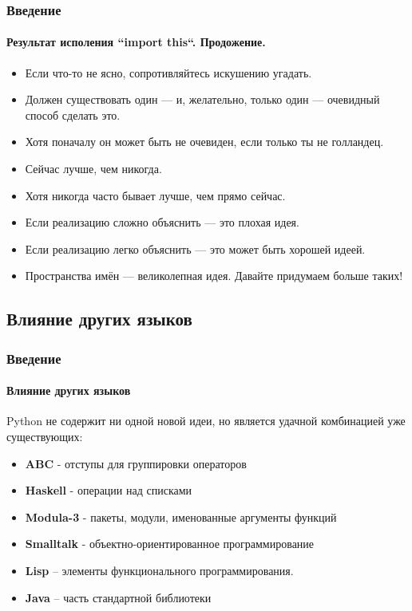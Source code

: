 \documentclass{beamer}
\begin{document}
\begin{frame}
\frametitle{Введение}
\framesubtitle{Результат исполения ``import this``. Продожение.}
\begin{itemize}
     \item<1-> Если что-то не ясно, сопротивляйтесь искушению угадать.
	 \item<1-> Должен существовать один — и, желательно, только один — очевидный способ сделать это.
	 \item<1-> Хотя поначалу он может быть не очевиден, если только ты не голландец.
	 \item<1-> Сейчас лучше, чем никогда.
	 \item<1-> Хотя никогда часто бывает лучше, чем прямо сейчас.
	 \item<1-> Если реализацию сложно объяснить — это плохая идея.
	 \item<1-> Если реализацию легко объяснить — это может быть хорошей идеей.
	 \item<1-> Пространства имён — великолепная идея. Давайте придумаем больше таких! 
\end{itemize}
\end{frame}

\subsection{Влияние других языков}
\begin{frame}
\frametitle{Введение}
\framesubtitle{Влияние других языков}
Python не содержит ни одной новой идеи, но является удачной комбинацией уже существующих:
\begin{itemize}
  \item<1> \textbf{ABC} - отступы для группировки операторов 
  \item<1> \textbf{Haskell} - операции над списками
  \item<1> \textbf{Modula-3} - пакеты, модули, именованные аргументы функций
  \item<1> \textbf{Smalltalk} - объектно-ориентированное программирование 
  \item<1> \textbf{Lisp} – элементы функционального программирования.
  \item<1> \textbf{Java} – часть стандартной библиотеки
\end{itemize}
\end{frame}
\end{document}
